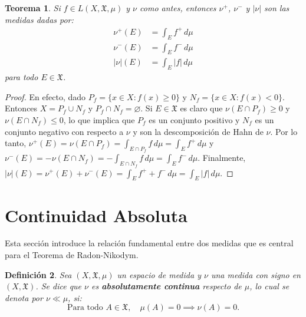 \documentclass[12pt,a4paper]{article}
\theoremstyle{profesional}
\newtheorem{teorema}{Teorema}[section]
\theoremstyle{definicion-style}
\newtheorem{definicion}[teorema]{Definición}
\newcommand{\X}{\mathfrak{X}}
\begin{document}
\begin{teorema}
    Si \( f \in L(X, \X, \mu) \) y \( \nu \) como antes, entonces \( \nu^+ \), \( \nu^- \) y \( |\nu| \) son las medidas dadas por:\begin{align*}
        \nu^+(E) & = \int_E f^+ \, d\mu \\
        \nu^-(E) & = \int_E f^- \, d\mu \\
        |\nu|(E) & = \int_E |f| \, d\mu
    \end{align*}
    para todo \( E \in \X \).
\end{teorema}
\begin{proof}
    En efecto, dado \( P_f = \{ x \in X : f(x) \geq 0 \} \) y \( N_f = \{ x \in X : f(x) < 0 \} \). Entonces \( X = P_f \cup N_f \) y \( P_f \cap N_f = \varnothing \).
    Si \( E \in \X \) es claro que \( \nu(E \cap P_f) \geq 0 \) y \( \nu(E \cap N_f) \leq 0 \), lo que implica que \( P_f \) es un conjunto positivo y \( N_f \) es un conjunto negativo con respecto a \( \nu \) y son la descomposición de Hahn de \( \nu \).
    Por lo tanto, \( \nu^+(E) = \nu(E \cap P_f) = \int_{E \cap P_f} f \, d\mu = \int_E f^+ \, d\mu \) y \( \nu^-(E) = -\nu(E \cap N_f) = -\int_{E \cap N_f} f \, d\mu = \int_E f^- \, d\mu \). Finalmente, \( |\nu|(E) = \nu^+(E) + \nu^-(E) = \int_E f^+ + f^- \, d\mu = \int_E |f| \, d\mu \).
\end{proof}

\section{Continuidad Absoluta}

Esta sección introduce la relación fundamental entre dos medidas que es central para el Teorema de Radon-Nikodym.

\begin{definicion}
    Sea \((X, \X, \mu)\) un espacio de medida y \(\nu \) una medida con signo en \((X,  \X)\). Se dice que \(\nu \) es \textbf{absolutamente continua} respecto de \(\mu \), lo cual se denota por \(\nu \ll \mu \), si:
    \[\text{Para todo } A \in \X, \quad \mu(A) = 0 \implies \nu(A) = 0.\]
\end{definicion}
\end{document}
